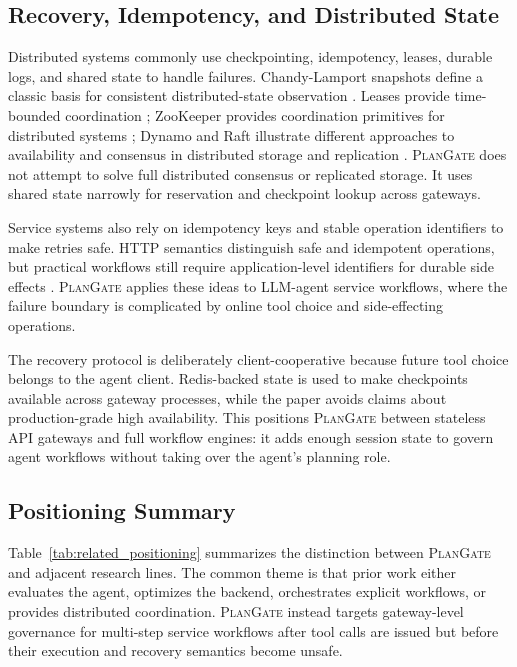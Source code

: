 \documentclass[5p,times]{elsarticle}
\newcommand{\plangate}{\textsc{PlanGate}\xspace}
\begin{document}
\subsection{Recovery, Idempotency, and Distributed State}

Distributed systems commonly use checkpointing, idempotency, leases, durable logs, and shared state to handle failures. Chandy-Lamport snapshots define a classic basis for consistent distributed-state observation \citep{chandy1985distributed}. Leases provide time-bounded coordination \citep{gray1989leases}; ZooKeeper provides coordination primitives for distributed systems \citep{hunt2010zookeeper}; Dynamo and Raft illustrate different approaches to availability and consensus in distributed storage and replication \citep{decandia2007dynamo,ongaro2014raft}. \plangate does not attempt to solve full distributed consensus or replicated storage. It uses shared state narrowly for reservation and checkpoint lookup across gateways.

Service systems also rely on idempotency keys and stable operation identifiers to make retries safe. HTTP semantics distinguish safe and idempotent operations, but practical workflows still require application-level identifiers for durable side effects \citep{rfc9110}. \plangate applies these ideas to LLM-agent service workflows, where the failure boundary is complicated by online tool choice and side-effecting operations.

The recovery protocol is deliberately client-cooperative because future tool choice belongs to the agent client. Redis-backed state is used to make checkpoints available across gateway processes, while the paper avoids claims about production-grade high availability. This positions \plangate between stateless API gateways and full workflow engines: it adds enough session state to govern agent workflows without taking over the agent's planning role.

\subsection{Positioning Summary}

Table~\ref{tab:related_positioning} summarizes the distinction between \plangate and adjacent research lines. The common theme is that prior work either evaluates the agent, optimizes the backend, orchestrates explicit workflows, or provides distributed coordination. \plangate instead targets gateway-level governance for multi-step service workflows after tool calls are issued but before their execution and recovery semantics become unsafe.
\end{document}
